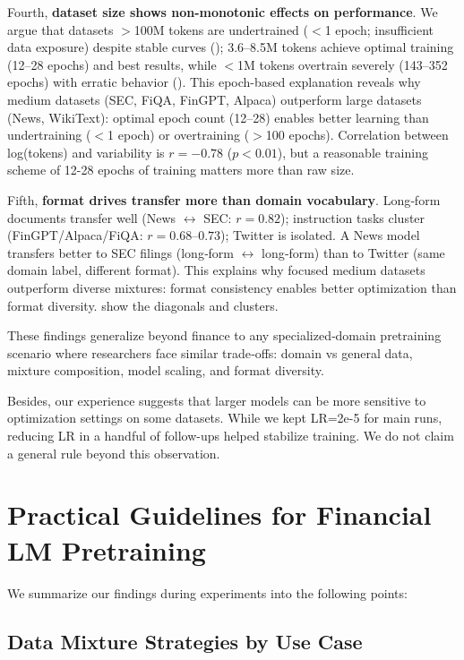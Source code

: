 Fourth, \textbf{dataset size shows non-monotonic effects on performance}. We argue that datasets $>$100M tokens are undertrained ($<$1 epoch; insufficient data exposure) despite stable curves (); 3.6–8.5M tokens achieve optimal training (12–28 epochs) and best results, while $<$1M tokens overtrain severely (143–352 epochs) with erratic behavior (). This epoch-based explanation reveals why medium datasets (SEC, FiQA, FinGPT, Alpaca) outperform large datasets (News, WikiText): optimal epoch count (12–28) enables better learning than undertraining ($<$1 epoch) or overtraining ($>$100 epochs). Correlation between log(tokens) and variability is $r=-0.78$ ($p<0.01$), but a reasonable training scheme of 12-28 epochs of training matters more than raw size.

Fifth, \textbf{format drives transfer more than domain vocabulary}. Long‑form documents transfer well (News $\leftrightarrow$ SEC: $r=0.82$); instruction tasks cluster (FinGPT/Alpaca/FiQA: $r=0.68$–$0.73$); Twitter is isolated. A News model transfers better to SEC filings (long‑form $\leftrightarrow$ long‑form) than to Twitter (same domain label, different format). This explains why focused medium datasets outperform diverse mixtures: format consistency enables better optimization than format diversity.  show the diagonals and clusters.

These findings generalize beyond finance to any specialized‑domain pretraining scenario where researchers face similar trade‑offs: domain vs general data, mixture composition, model scaling, and format diversity.

Besides, our experience suggests that larger models can be more sensitive to optimization settings on some datasets. While we kept LR=2e-5 for main runs, reducing LR in a handful of follow-ups helped stabilize training. We do not claim a general rule beyond this observation.

\section{Practical Guidelines for Financial LM Pretraining}

We summarize our findings during experiments into the following points:

\subsection{Data Mixture Strategies by Use Case}

